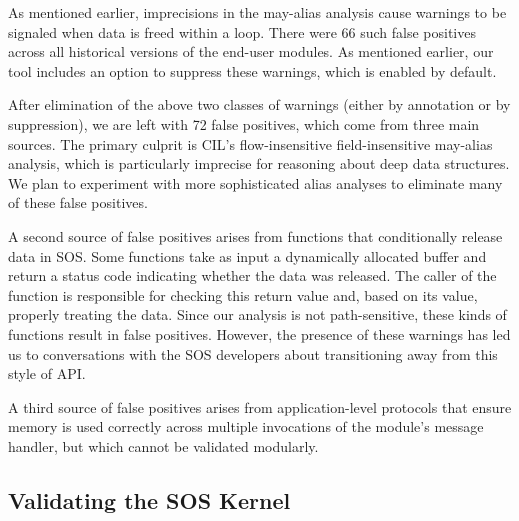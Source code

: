 \smallskip{}
%
As mentioned earlier, imprecisions in the may-alias analysis cause
warnings to be signaled when data is freed within a loop.
There were 66 such false positives across all historical versions of
the end-user modules.  As mentioned earlier, our tool includes an
option to suppress these warnings, which is enabled by default.  

\smallskip{}
%
After elimination of the above two classes of warnings (either by
annotation or by suppression), we are left with 72 false positives,
which come from three main sources.  The primary culprit is CIL's
flow-insensitive field-insensitive may-alias analysis, which is
particularly imprecise for reasoning about deep data structures.  
We plan to experiment with more sophisticated alias analyses to
eliminate many of these false positives.

A second source of false positives arises from functions that
conditionally release data in SOS.  Some functions take as input a
dynamically allocated buffer and return a status code indicating
whether the data was released.  The caller of the function is
responsible for checking this return value and, based on its value,
properly treating the data.  Since our analysis is not path-sensitive,
these kinds of functions result in false positives.  However, the
presence of these warnings has led us to conversations with the SOS
developers about transitioning away from this style of API.

A third source of false positives arises from application-level
protocols that ensure memory is used correctly across multiple
invocations of the module's message handler, but which cannot be
validated modularly.



\subsection{Validating the SOS Kernel}

